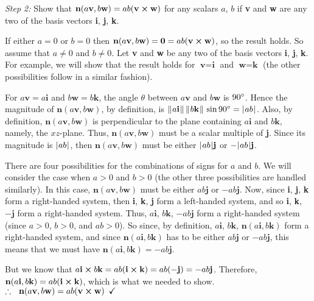 \par\noindent \emph{Step 2:} Show that $\textbf{n}(a\textbf{v},b\textbf{w}) = ab(\textbf{v} \bm{\times} \textbf{w})$
for any scalars $a$, $b$ if \textbf{v} and \textbf{w} are any two of the basis vectors \textbf{i}, \textbf{j},
\textbf{k}.\vspace{1mm}
\par\noindent If either $a = 0$ or $b = 0$ then $\textbf{n}(a\textbf{v},b\textbf{w}) = \textbf{0} =
ab(\textbf{v} \bm{\times} \textbf{w})$, so the result holds. So assume that $a \ne 0$ and $b \ne 0$. Let \textbf{v} and
\textbf{w} be any two of the basis vectors \textbf{i}, \textbf{j}, \textbf{k}. For example, we will show that the result
holds for $\textbf{v} = \textbf{i}$ and $\textbf{w} = \textbf{k}$ (the other possibilities follow in a similar
fashion).

For $a\textbf{v} = a\textbf{i}$ and $b\textbf{w} = b\textbf{k}$, the
angle $\theta$ between $a\textbf{v}$ and $b\textbf{w}$ is $90^\circ$. Hence the magnitude of
$\textbf{n}(a\textbf{v},b\textbf{w})$, by definition, is
$\lVert\mspace{1mu}a\textbf{i}\mspace{1mu}\rVert\,\lVert\mspace{1mu}b\textbf{k}\mspace{1mu}\rVert\,\sin 90^\circ = \lvert\mspace{1mu}ab\mspace{1mu}\rvert$. Also, by definition,
$\textbf{n}(a\textbf{v},b\textbf{w})$ is perpendicular to the plane containing $a\textbf{i}$ and $b\textbf{k}$, namely,
the $xz$-plane. Thus, $\textbf{n}(a\textbf{v},b\textbf{w})$ must be a scalar multiple of \textbf{j}. Since its magnitude
is $\lvert\mspace{1mu}ab\mspace{1mu}\rvert$, then $\textbf{n}(a\textbf{v},b\textbf{w})$ must be either $\lvert\mspace{1mu}ab\mspace{1mu}\rvert\textbf{j}$ or $-\lvert\mspace{1mu}ab\mspace{1mu}\rvert\textbf{j}$.

There are four possibilities for the combinations of signs for $a$ and $b$. We will consider the case when $a > 0$
and $b > 0$ (the other three possibilities are handled similarly).
\newpage
In this case, $\textbf{n}(a\textbf{v},b\textbf{w})$
must be either $ab\textbf{j}$ or $-ab\textbf{j}$. Now, since \textbf{i}, \textbf{j}, \textbf{k} form a
right-handed system, then \textbf{i}, \textbf{k}, \textbf{j} form a left-handed system, and so \textbf{i}, \textbf{k},
$-\textbf{j}$ form a right-handed system. Thus, $a\textbf{i}$, $b\textbf{k}$,
$-ab\textbf{j}$ form a right-handed
system (since $a > 0$, $b > 0$, and $ab > 0$). So since, by definition, $a\textbf{i}$, $b\textbf{k}$, 
$\textbf{n}(a\textbf{i},b\textbf{k})$ form a right-handed system, and since $\textbf{n}(a\textbf{i},b\textbf{k})$ has to
be either $ab\textbf{j}$ or $-ab\textbf{j}$, this means that we must have $\textbf{n}(a\textbf{i},b\textbf{k}) =
-ab\textbf{j}$.

But we know that $a\textbf{i} \bm{\times} b\textbf{k} = ab (\textbf{i} \bm{\times} \textbf{k}) =
ab (-\textbf{j}) = -ab\textbf{j}$. Therefore, $\textbf{n}(a\textbf{i},b\textbf{k}) =
ab(\textbf{i} \bm{\times} \textbf{k})$, which is what we needed to show.\\
$\therefore ~~ \textbf{n}(a\textbf{v},b\textbf{w}) = ab(\textbf{v} \bm{\times} \textbf{w}) \enskip\checkmark$\\

